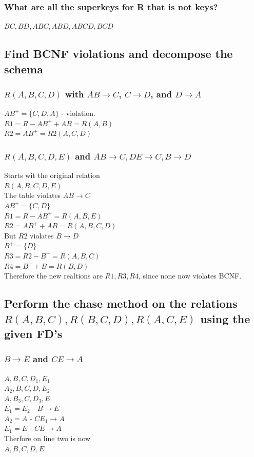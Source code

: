 \documentclass[12pt, a4paper]{article}
\begin{document}
			\subsubsection{What are all the superkeys for R that is not keys?}
				$BC,BD,ABC,ABD,ABCD,BCD$	
		\subsection{Find BCNF violations and decompose the schema}
			\subsubsection{$R(A,B,C,D)$ with $AB\rightarrow C$, $C\rightarrow D$, and $D\rightarrow A$}
				$AB^+=\{C,D,A\}$ - violation.\\
				$R1=R-AB^++AB=R(A,B)$\\
				$R2=AB^+=R2(A,C,D)$
			\subsubsection{$R(A,B,C,D,E)$ and $AB\rightarrow C, DE\rightarrow C, B\rightarrow D$}
				Starts wit the original relation\\
				$R(A,B,C,D,E)$\\
				The table violates $AB\rightarrow C$\\
				$AB^+=\{C,D\}$\\
				$R1=R-AB^+=R(A,B,E)$\\
				$R2=AB^++AB=R(A,B,C,D)$\\
				But $R2$ violates $B\rightarrow D$\\
				$B^+=\{D\}$\\
				$R3=R2-B^+=R(A,B,C)$\\
				$R4=B^++B=R(B,D)$\\
				Therefore the new realtions are $R1,R3,R4$, since none now violates BCNF.
				\subsection{Perform the chase method on the relations \\$R(A,B,C),R(B,C,D),R(A,C,E)$ using the given FD's}
					\subsubsection{$B\rightarrow E$ and $CE\rightarrow A$}
						$A,B,C,D_1,E_1$\\
						$A_2,B,C,D,E_2$\\
						$A,B_3,C,D_3,E$\\
						$E_1=E_2$ - $B\rightarrow E$\\
						$A_2=A$ - $CE_1 \rightarrow A$\\
						$E_1=E$ - $CE \rightarrow A$\\
						Therfore on line two is now\\
						$A,B,C,D,E$
\end{document}
